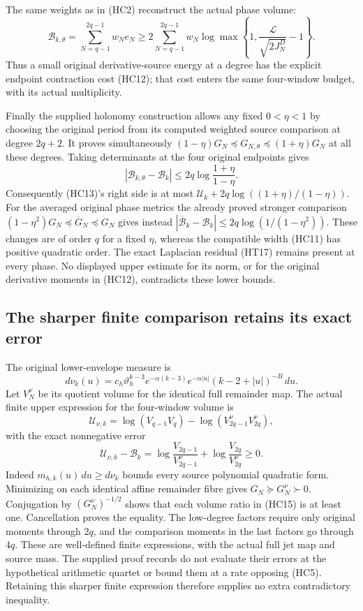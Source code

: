 The same weights as in (HC2) reconstruct the actual phase volume:
\[
 \boxed{
 \mathcal B_{k,\theta}=\sum_{N=q-1}^{2q-1}w_N e_N
 \geq2\sum_{N=q-1}^{2q-1}w_N
 \log\max\left\{1,\frac{\mathcal L}{\sqrt{2J_N^D}}-1\right\}.}
 \tag{HC13}
\]
Thus a small original derivative-source energy at a degree has the
explicit endpoint contraction cost (HC12); that cost enters the same
four-window budget, with its actual multiplicity.

Finally the supplied holonomy construction allows any fixed
$0<\eta<1$ by choosing the original period from its computed weighted
source comparison at degree $2q+2$.  It proves simultaneously
$(1-\eta)G_N\preceq G_{N,\theta}\preceq(1+\eta)G_N$ at all these
degrees.  Taking determinants at the four original endpoints gives
\[
 |\mathcal B_{k,\theta}-\mathcal B_k|
 \leq2q\log\frac{1+\eta}{1-\eta}.\tag{HC14}
\]
Consequently (HC13)'s right side is at most
$\widehat{\mathcal U}_k+2q\log((1+\eta)/(1-\eta))$.
For the averaged original phase metrics the already proved stronger
comparison $(1-\eta^2)G_N\preceq\overline G_N\preceq G_N$ gives instead
$|\overline{\mathcal B}_k-\mathcal B_k|
\leq2q\log(1/(1-\eta^2))$.  These changes are of order $q$ for a fixed
$\eta$, whereas the compatible width (HC11) has positive quadratic
order.  The exact Laplacian residual (HT17) remains present at every
phase.  No displayed upper estimate for its norm, or for the original
derivative moments in (HC12), contradicts these lower bounds.

\subsection{The sharper finite comparison retains its exact error}

The original lower-envelope measure is
\[
 d\nu_k(u)=c_h\vartheta_h^{k-3}e^{-\alpha(k-3)}
 e^{-\alpha|u|}(k-2+|u|)^{-B}\,du.
\]
Let $V_N^\nu$ be its quotient volume for the identical full remainder
map.  The actual finite upper expression for the four-window volume is
\[
 \mathcal U_{\nu,k}=\log(V_{q-1}V_q)
                  -\log(V_{2q-1}^\nu V_{2q}^\nu),
\]
with the exact nonnegative error
\[
 \boxed{
 \mathcal U_{\nu,k}-\mathcal B_k
 =\log\frac{V_{2q-1}}{V_{2q-1}^\nu}
  +\log\frac{V_{2q}}{V_{2q}^\nu}\geq0.}\tag{HC15}
\]
Indeed $m_{h,k}(u)\,du\geq d\nu_k$ bounds every source polynomial
quadratic form.  Minimizing on each identical affine remainder fibre
gives $G_N\succeq G_N^\nu\succ0$.  Conjugation by
$(G_N^\nu)^{-1/2}$ shows that each volume ratio in (HC15) is at least
one.  Cancellation proves the equality.  The low-degree factors require
only original moments through $2q$, and the comparison moments in the
last factors go through $4q$.  These are well-defined finite expressions,
with the actual full jet map and source mass.  The supplied proof
records do not evaluate their errors at the hypothetical arithmetic
quartet or bound them at a rate opposing (HC5).  Retaining this sharper
finite expression therefore supplies no extra contradictory inequality.
